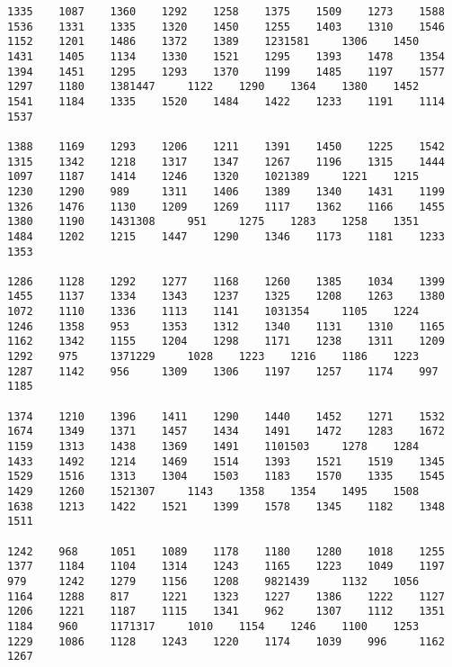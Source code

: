 \begin{verbatim}
1335    1087    1360    1292    1258    1375    1509    1273    1588    1536    1331    1335    1320    1450    1255    1403    1310    1546    1152    1201    1486    1372    1389    1231581     1306    1450    1431    1405    1134    1330    1521    1295    1393    1478    1354    1394    1451    1295    1293    1370    1199    1485    1197    1577    1297    1180    1381447     1122    1290    1364    1380    1452    1541    1184    1335    1520    1484    1422    1233    1191    1114    1537

1388    1169    1293    1206    1211    1391    1450    1225    1542    1315    1342    1218    1317    1347    1267    1196    1315    1444    1097    1187    1414    1246    1320    1021389     1221    1215    1230    1290    989     1311    1406    1389    1340    1431    1199    1326    1476    1130    1209    1269    1117    1362    1166    1455    1380    1190    1431308     951     1275    1283    1258    1351    1484    1202    1215    1447    1290    1346    1173    1181    1233    1353

1286    1128    1292    1277    1168    1260    1385    1034    1399    1455    1137    1334    1343    1237    1325    1208    1263    1380    1072    1110    1336    1113    1141    1031354     1105    1224    1246    1358    953     1353    1312    1340    1131    1310    1165    1162    1342    1155    1204    1298    1171    1238    1311    1209    1292    975     1371229     1028    1223    1216    1186    1223    1287    1142    956     1309    1306    1197    1257    1174    997     1185

1374    1210    1396    1411    1290    1440    1452    1271    1532    1674    1349    1371    1457    1434    1491    1472    1283    1672    1159    1313    1438    1369    1491    1101503     1278    1284    1433    1492    1214    1469    1514    1393    1521    1519    1345    1529    1516    1313    1304    1503    1183    1570    1335    1545    1429    1260    1521307     1143    1358    1354    1495    1508    1638    1213    1422    1521    1399    1578    1345    1182    1348    1511

1242    968     1051    1089    1178    1180    1280    1018    1255    1377    1184    1104    1314    1243    1165    1223    1049    1197    979     1242    1279    1156    1208    9821439     1132    1056    1164    1288    817     1221    1323    1227    1386    1222    1127    1206    1221    1187    1115    1341    962     1307    1112    1351    1184    960     1171317     1010    1154    1246    1100    1253    1229    1086    1128    1243    1220    1174    1039    996     1162    1267


\end{verbatim}
